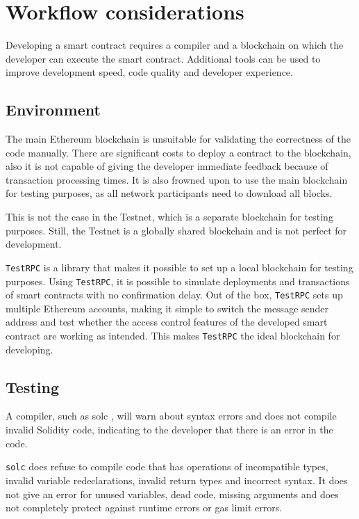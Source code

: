 \section{Workflow considerations}
Developing a smart contract requires a compiler and a blockchain on which the developer can execute the smart contract. Additional tools can be used to improve development speed, code quality and developer experience.

\subsection{Environment}

The main Ethereum blockchain is unsuitable for validating the correctness of the code manually. There are significant costs to deploy a contract to the blockchain, also it is not capable of giving the developer immediate feedback because of transaction processing times. It is also frowned upon to use the main blockchain for testing purposes, as all network participants need to download all blocks.

This is not the case in the Testnet, which is a separate blockchain for testing purposes. Still, the Testnet is a globally shared blockchain and is not perfect for development.

\texttt{TestRPC} \cite{TestRPC} is a library that makes it possible to set up a local blockchain for testing purposes. Using \texttt{TestRPC}, it is possible to simulate deployments and transactions of smart contracts with no confirmation delay. Out of the box, \texttt{TestRPC} sets up multiple Ethereum accounts, making it simple to switch the message sender address and test whether the access control features of the developed smart contract are working as intended. This makes \texttt{TestRPC} the ideal blockchain for developing.

\subsection{Testing}

A compiler, such as solc \cite{Solc}, will warn about syntax errors and does not compile invalid Solidity code, indicating to the developer that there is an error in the code.

\texttt{solc} does refuse to compile code that has operations of incompatible types, invalid variable redeclarations, invalid return types and incorrect syntax. 
It does not give an error for unused variables, dead code, missing arguments and does not completely protect against runtime errors or gas limit errors.

